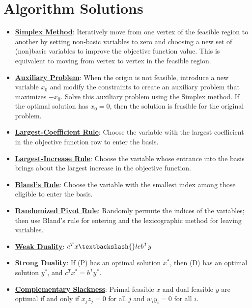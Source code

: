 \documentclass{article}%
\begin{document}
\section{Algorithm Solutions}%
\label{sec:AlgorithmSolutions}%
\begin{itemize}[leftmargin=*]%
\item \href{https://www.math.purdue.edu/~yipn/421/2024-08-27-ExSimplex.pdf#page=6}{\textbf{Simplex Method}}: Iteratively move from one vertex of the feasible region to another by setting non-basic variables to zero and choosing a new set of (non)basic variables to improve the objective function value. This is equivalent to moving from vertex to vertex in the feasible region.%
\item \href{https://www.math.purdue.edu/~yipn/421/2024-08-27-ExSimplex.pdf#page=32}{\textbf{Auxiliary Problem}}: When the origin is not feasible, introduce a new variable $x_0$ and modify the constraints to create an auxiliary problem that maximizes $-x_0$. Solve this auxiliary problem using the Simplex method. If the optimal solution has $x_0 = 0$, then the solution is feasible for the original problem.%
\end{itemize}%
\begin{itemize}[leftmargin=*]%
\item \href{https://www.math.purdue.edu/~yipn/421/2024-09-05-SimplexEfficiency.pdf#page=4}{\textbf{Largest{-}Coefficient Rule}}: Choose the variable with the largest coefficient in the objective function row to enter the basis.%
\item \href{https://www.math.purdue.edu/~yipn/421/2024-09-05-SimplexEfficiency.pdf#page=6}{\textbf{Largest{-}Increase Rule}}: Choose the variable whose entrance into the basis brings about the largest increase in the objective function.%
\item \href{https://www.math.purdue.edu/~yipn/421/2024-09-05-SimplexEfficiency.pdf#page=10}{\textbf{Bland's Rule}}: Choose the variable with the smallest index among those eligible to enter the basis.%
\item \href{https://www.math.purdue.edu/~yipn/421/2024-09-05-SimplexEfficiency.pdf#page=10}{\textbf{Randomized Pivot Rule}}: Randomly permute the indices of the variables; then use Bland's rule for entering and the lexicographic method for leaving variables.%
\end{itemize}%
\begin{itemize}[leftmargin=*]%
\item \href{https://www.math.purdue.edu/~yipn/421/2024-09-12-Duality.pdf#page=2}{\textbf{Weak Duality}}: $c^T x \textbackslash{}le b^T y$%
\item \href{https://www.math.purdue.edu/~yipn/421/2024-09-12-Duality.pdf#page=11}{\textbf{Strong Duality}}: If (P) has an optimal solution $x^*$, then (D) has an optimal solution $y^*$, and $c^T x^* = b^T y^*$.%
\item \href{https://www.math.purdue.edu/~yipn/421/2024-09-12-Duality.pdf#page=21}{\textbf{Complementary Slackness}}: Primal feasible $x$ and dual feasible $y$ are optimal if and only if $x_j z_j = 0$ for all $j$ and $w_i y_i = 0$ for all $i$.%
\end{itemize}%
\end{document}
